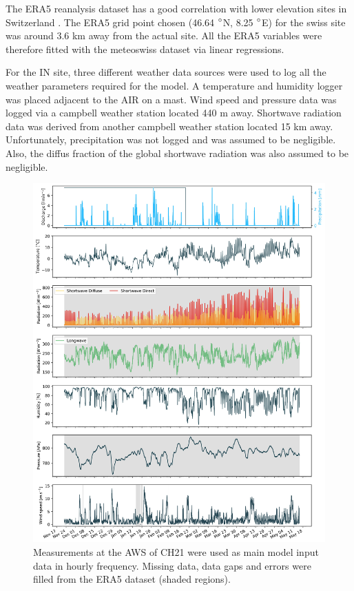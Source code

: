 \documentclass[utf8]{frontiersSCNS} %
\begin{document}
The ERA5 reanalysis dataset has a good correlation with lower elevation sites in Switzerland \citep{Scherrer_2020}. The
ERA5 grid point chosen (46.64 $\degree$N, 8.25 $\degree$E) for the swiss site was around 3.6 km away from the actual
site.  All the ERA5 variables were therefore fitted with the meteoswiss dataset via linear regressions.

For the IN site, three different weather data sources were used to log all the weather parameters required for the
model. A temperature and humidity logger was placed adjacent to the AIR on a mast. Wind speed and pressure data was logged via a
campbell weather station located 440 m away. Shortwave radiation data was derived from another campbell weather station
located 15 km away. Unfortunately, precipitation was not logged and was assumed to be negligible. Also, the diffus
fraction of the global shortwave radiation was also assumed to be negligible.

\begin{figure} 
    \centering 
    \includegraphics[width=\linewidth]{./Figures/Model_Input.jpg} 
\caption{Measurements at the AWS of CH21 were used as main model input data in hourly frequency. Missing data, data gaps
and errors were filled from the ERA5 dataset (shaded regions).} 
    \label{fig:input} 
\end{figure}
\end{document}
